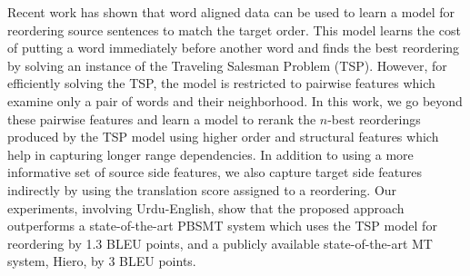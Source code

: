 Recent work has shown that word aligned data can be used to learn a model for reordering source sentences to match the target order. This model learns the
 cost of putting a word immediately before another word and finds the best
 reordering by solving an instance of the Traveling Salesman Problem (TSP).
 However, for efficiently solving the TSP, the model is restricted to pairwise
 features which examine only a pair of words and their neighborhood. In this
 work, we go beyond these pairwise features and learn a model to rerank the
 $n$-best reorderings produced by the TSP model using higher order and
 structural features which help in capturing longer range dependencies. In
 addition to using a more informative set of source side features, we also
 capture target side features indirectly by using the translation score assigned
 to a reordering. Our experiments, involving Urdu-English, show that the
 proposed approach outperforms a state-of-the-art PBSMT system which uses the
 TSP model for reordering by 1.3 BLEU points, and a publicly available
 state-of-the-art MT system, Hiero, by 3 BLEU points.

